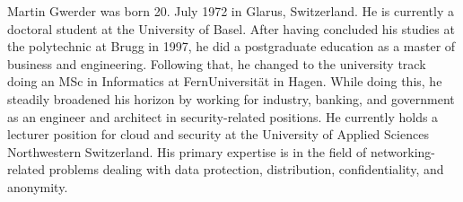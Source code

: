 
Martin Gwerder was born 20. July 1972 in Glarus, Switzerland. He is currently a doctoral student at the University of Basel. After having concluded his studies at the polytechnic at Brugg in 1997, he did a postgraduate education as a master of business and engineering. Following that, he changed to the university track doing an MSc in Informatics at FernUniversit\"at in Hagen. While doing this, he steadily broadened his horizon by working for industry, banking, and government as an engineer and architect in security-related positions. He currently holds a lecturer position for cloud and security at the University of Applied Sciences Northwestern Switzerland. His primary expertise is in the field of networking-related problems dealing with data protection, distribution, confidentiality, and anonymity.